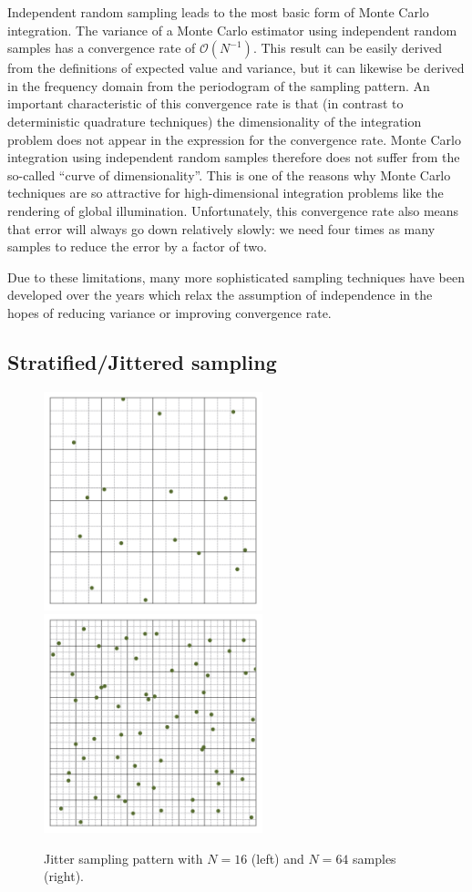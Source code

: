 \documentclass[11pt,fleqn]{book} %
\begin{document}
%
%
%

Independent random sampling leads to the most basic form of Monte Carlo integration. The variance of a Monte Carlo estimator using independent random samples has a convergence rate of $\mathcal{O}(N^{-1})$. This result can be easily derived from the definitions of expected value and variance, but it can likewise be derived in the frequency domain from the periodogram of the sampling pattern. An important characteristic of this convergence rate is that (in contrast to deterministic quadrature techniques) the dimensionality of the integration problem does not appear in the expression for the convergence rate. Monte Carlo integration using independent random samples therefore does not suffer from the so-called ``curve of dimensionality''. This is one of the reasons why Monte Carlo techniques are so attractive for high-dimensional integration problems like the rendering of global illumination. Unfortunately, this convergence rate also means that error will always go down relatively slowly: we need four times as many samples to reduce the error by a factor of two.

Due to these limitations, many more sophisticated sampling techniques have been developed over the years which relax the assumption of independence in the hopes of reducing variance or improving convergence rate.

\subsection{Stratified/Jittered sampling}
\begin{figure}[ht]
  \centering
  \includegraphics[width=2.5in]{Pictures/pointset-gridvisualize/points-jitter-n16.pdf}
    \includegraphics[width=2.5in]{./Pictures/pointset-gridvisualize/points-jitter-n64.pdf}
  \caption{Jitter sampling pattern with $N=16$ (left) and $N = 64$ samples (right).}
  \label{fig:jitter}
\end{figure}
\end{document}
